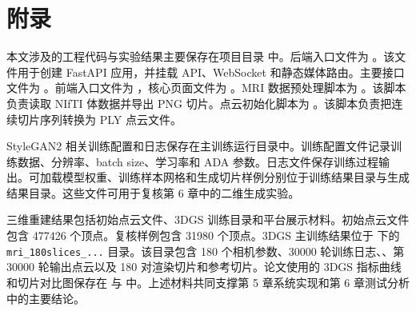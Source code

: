 \chapter*{附\quad 录}
\thispagestyle{thesis-main}

\thesisbodyfont
\justifying


本文涉及的工程代码与实验结果主要保存在项目目录  中。后端入口文件为 。该文件用于创建 FastAPI 应用，并挂载 API、WebSocket 和静态媒体路由。主要接口文件为 。前端入口文件为 ，核心页面文件为 。MRI 数据预处理脚本为 。该脚本负责读取 NIfTI 体数据并导出 PNG 切片。点云初始化脚本为 。该脚本负责把连续切片序列转换为 PLY 点云文件。

StyleGAN2 相关训练配置和日志保存在主训练运行目录中。训练配置文件记录训练数据、分辨率、batch size、学习率和 ADA 参数。日志文件保存训练过程输出。可加载模型权重、训练样本网格和生成切片样例分别位于训练结果目录与生成结果目录。这些文件可用于复核第 6 章中的二维生成实验。

三维重建结果包括初始点云文件、3DGS 训练目录和平台展示材料。初始点云文件  包含 477426 个顶点。复核样例包含 31980 个顶点。3DGS 主训练结果位于  下的 \texttt{mri\_180slices\_...} 目录。该目录包含 180 个相机参数、30000 轮训练日志、、第 30000 轮输出点云以及 180 对渲染切片和参考切片。论文使用的 3DGS 指标曲线和切片对比图保存在  与  中。上述材料共同支撑第 5 章系统实现和第 6 章测试分析中的主要结论。
